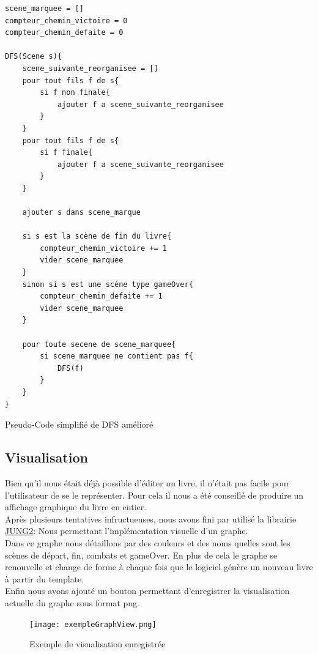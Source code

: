 \documentclass[12pt]{article}
\begin{document}
\begin{listing}[H]
\begin{verbatim}
scene_marquee = []
compteur_chemin_victoire = 0
compteur_chemin_defaite = 0

DFS(Scene s){
    scene_suivante_reorganisee = []
    pour tout fils f de s{
        si f non finale{
            ajouter f a scene_suivante_reorganisee
        }
    }
    pour tout fils f de s{
        si f finale{
            ajouter f a scene_suivante_reorganisee
        }
    }
    
    ajouter s dans scene_marque

    si s est la scène de fin du livre{
        compteur_chemin_victoire += 1
        vider scene_marquee
    }
    sinon si s est une scène type gameOver{
        compteur_chemin_defaite += 1
        vider scene_marquee
    }
    
    pour toute secene de scene_marquee{
        si scene_marquee ne contient pas f{
            DFS(f)
        }
    }
}
\end{verbatim}
\caption{Pseudo-Code simplifié de DFS amélioré}
\end{listing}

\subsection{Visualisation}
Bien qu'il nous était déjà possible d'éditer un livre, il n'était pas facile pour l'utilisateur de se le représenter. Pour cela il nous a été conseillé de produire un affichage graphique du livre en entier.\\
Après plusieurs tentatives infructueuses, nous avons fini par utilisé la librairie  
\href{http://jung.sourceforge.net/}{\underline{JUNG2}}: Nous permettant l'implémentation visuelle d'un graphe.\\
Dans ce graphe nous détaillons par des couleurs et des noms quelles sont les scènes de départ, fin, combats et gameOver. En plus de cela le graphe se renouvelle et change de forme à chaque fois que le logiciel génère un nouveau livre à partir du template.\\
Enfin nous avons ajouté un bouton permettant d'enregistrer la visualisation actuelle du graphe sous format png.


\begin{figure}[h]
    \centering
    \texttt{[image: exempleGraphView.png]}
    \caption{Exemple de visualisation enregistrée}
\end{figure}
\end{document}
